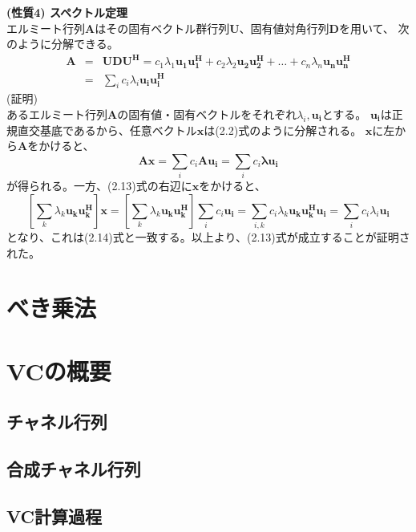 \vspace{5mm}
\noindent\textbf{(性質4) \quad スペクトル定理} \\
エルミート行列$\bm{A}$はその固有ベクトル群行列$\bm{U}$、固有値対角行列$\bm{D}$を用いて、
次のように分解できる。 \\
\begin{eqnarray}
    \bm{A} &=& \bm{UDU^H} = c_1\lambda_1\bm{u_1u_1^H}+c_2\lambda_2\bm{u_2u_2^H}+\ldots+c_n\lambda_n\bm{u_nu_n^H} \nonumber \\
    &=& \sum_i c_i\lambda_i\bm{u_iu_i^H}
\end{eqnarray}
\vspace{3mm}
(証明) \\
あるエルミート行列$\bm{A}$の固有値・固有ベクトルをそれぞれ$\lambda_i,\bm{u_i}$とする。
$\bm{u_i}$は正規直交基底であるから、任意ベクトル$\bm{x}$は(2.2)式のように分解される。
$\bm{x}$に左から$\bm{A}$をかけると、
\begin{equation}
    \bm{Ax} = \sum_i c_i\bm{Au_i} = \sum_i c_i\bm{\lambda u_i}
\end{equation}
が得られる。一方、(2.13)式の右辺に$\bm{x}$をかけると、
\begin{equation}
    \left[
        \sum_k \lambda_k\bm{u_ku_k^H}
    \right]\bm{x}
    = \left[
        \sum_k \lambda_k\bm{u_ku_k^H}
    \right]\sum_i c_i\bm{u_i}
    = \sum_{i,k} c_i\lambda_k\bm{u_ku_k^Hu_i}
    = \sum_i c_i\lambda_i\bm{u_i} \nonumber
\end{equation}
となり、これは(2.14)式と一致する。以上より、(2.13)式が成立することが証明された。

\section{べき乗法}

\section{VCの概要}
\subsection{チャネル行列}
\subsection{合成チャネル行列}
\subsection{VC計算過程}

